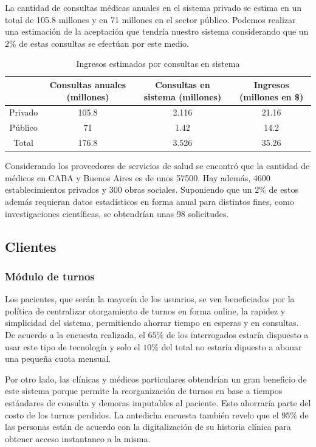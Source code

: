 \documentclass[a4paper,10pt]{article}
\begin{document}
La cantidad de consultas médicas anuales en el sistema privado se estima en un total de 105.8 millones y en 71 millones en el sector público. Podemos realizar una estimación de la aceptación que tendría nuestro sistema considerando que un $2\%$ de estas consultas se efectúan por este medio.

\begin{table} [H]
\begin{center}
\begin{tabular}{|c|c|c|c|}
\hline
		&Consultas anuales (millones)	&Consultas en sistema (millones)	&Ingresos (millones en \$)\\\hline
Privado	&105.8							&2.116								&21.16\\\hline
Público	&71								&1.42								&14.2\\\hline
Total	&176.8							&3.526								&35.26\\\hline
\end{tabular}
\end{center}
\caption{Ingresos estimados por consultas en sistema}
\end{table}

Considerando los proveedores de servicios de salud se encontró que la cantidad de médicos en CABA y Buenos Aires es de unos 57500. Hay además, 4600 establecimientos privados y 300 obras sociales. Suponiendo que un $2\%$ de estos además requieran datos estadísticos en forma anual para distintos fines, como investigaciones científicas, se obtendrían unas 98 solicitudes.

\subsection{Clientes}

\subsubsection{Módulo de turnos}

Los pacientes, que serán la mayoría de los usuarios, se ven beneficiados por la política de centralizar otorgamiento de turnos en forma online, la rapidez y simplicidad del sistema, permitiendo ahorrar tiempo en esperas y en consultas. De acuerdo a la encuesta realizada, el $65\%$ de los interrogados estaría dispuesto a usar este tipo de tecnología y solo el $10\%$ del total no estaría dipuesto a abonar una pequeña cuota mensual. 

Por otro lado, las clínicas y médicos particulares obtendrían un gran beneficio de este sistema porque permite la reorganización de turnos en base a tiempos estándares de consulta y demoras imputables al paciente. Esto ahorraría parte del costo de los turnos perdidos. La antedicha encuesta también revelo que el $95\%$ de las personas están de acuerdo con la digitalización de su historia clínica para obtener acceso instantaneo a la misma.
\end{document}
